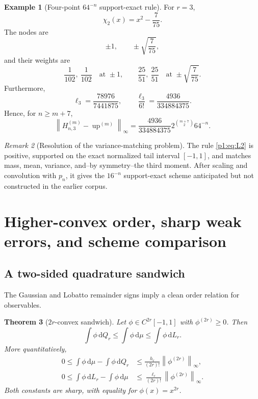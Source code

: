\documentclass[11pt]{article}
\numberwithin{equation}{section}
\newtheorem{theorem}{Theorem}[section]
\theoremstyle{definition}
\newtheorem{example}[theorem]{Example}
\theoremstyle{remark}
\newtheorem{remark}[theorem]{Remark}
\newcommand{\Up}{\operatorname{up}}
\newcommand{\dd}{\,\mathrm d}
\newcommand{\norm}[1]{\left\lVert#1\right\rVert}
\begin{document}
\begin{example}[Four-point $64^{-n}$ support-exact rule]
For $r=3$,
\[
 \chi_2(x)=x^2-\frac7{75}.
\]
The nodes are
\begin{equation}
 \pm1,\qquad \pm\sqrt{\frac7{75}},
 \label{p1:eq:L3-nodes}
\end{equation}
and their weights are
\begin{equation}
 \frac1{102},\ \frac1{102}
 \quad\text{at }\pm1,
 \qquad
 \frac{25}{51},\ \frac{25}{51}
 \quad\text{at }\pm\sqrt{\frac7{75}}.
 \label{p1:eq:L3-weights}
\end{equation}
Furthermore,
\[
 \ell_3=\frac{78976}{7441875},
 \qquad
 \frac{\ell_3}{6!}=\frac{4936}{334884375}.
\]
Hence, for $n\ge m+7$,
\begin{equation}
 \boxed{
 \norm{H_{n,3}^{(m)}-\Up^{(m)}}_\infty
 =\frac{4936}{334884375}
 2^{\binom{m+7}{2}}64^{-n}.}
 \label{p1:eq:Hn3-error}
\end{equation}
\end{example}

\begin{remark}[Resolution of the variance-matching problem]
The rule \eqref{p1:eq:L2} is positive, supported on the exact normalized tail interval $[-1,1]$, and matches mass, mean, variance, and--by symmetry--the third moment.  After scaling and convolution with $p_n$, it gives the $16^{-n}$ support-exact scheme anticipated but not constructed in the earlier corpus.
\end{remark}

\section{Higher-convex order, sharp weak errors, and scheme comparison}
\label{p1:sec:convex-order}

\subsection{A two-sided quadrature sandwich}

The Gaussian and Lobatto remainder signs imply a clean order relation for observables.

\begin{theorem}[$2r$-convex sandwich]
\label{p1:thm:sandwich}
Let $\phi\in C^{2r}[-1,1]$ with $\phi^{(2r)}\ge0$.  Then
\begin{equation}
 \boxed{
 \int\phi\dd Q_r
 \le \int\phi\dd\mu
 \le \int\phi\dd L_r.}
 \label{p1:eq:sandwich}
\end{equation}
More quantitatively,
\begin{align}
 0\le \int\phi\dd\mu-\int\phi\dd Q_r
 &\le \frac{h_r}{(2r)!}\norm{\phi^{(2r)}}_\infty,
 \label{p1:eq:G-weak-bound}\\
 0\le \int\phi\dd L_r-\int\phi\dd\mu
 &\le \frac{\ell_r}{(2r)!}\norm{\phi^{(2r)}}_\infty.
 \label{p1:eq:L-weak-bound}
\end{align}
Both constants are sharp, with equality for $\phi(x)=x^{2r}$.
\end{theorem}
\end{document}
